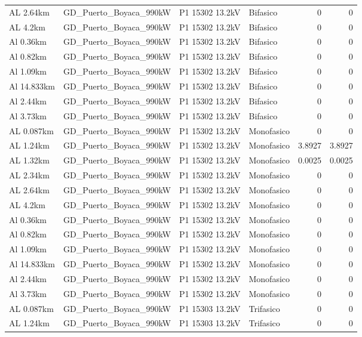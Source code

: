 \documentclass[11pt,a4paper]{article}
\begin{document}
\begin{longtable}{llllrr}
AL 2.64km & GD\_Puerto\_Boyaca\_990kW & P1 15302 13.2kV & Bifasico & 0 & 0 \\
AL 4.2km & GD\_Puerto\_Boyaca\_990kW & P1 15302 13.2kV & Bifasico & 0 & 0 \\
Al 0.36km & GD\_Puerto\_Boyaca\_990kW & P1 15302 13.2kV & Bifasico & 0 & 0 \\
Al 0.82km & GD\_Puerto\_Boyaca\_990kW & P1 15302 13.2kV & Bifasico & 0 & 0 \\
Al 1.09km & GD\_Puerto\_Boyaca\_990kW & P1 15302 13.2kV & Bifasico & 0 & 0 \\
Al 14.833km & GD\_Puerto\_Boyaca\_990kW & P1 15302 13.2kV & Bifasico & 0 & 0 \\
Al 2.44km & GD\_Puerto\_Boyaca\_990kW & P1 15302 13.2kV & Bifasico & 0 & 0 \\
Al 3.73km & GD\_Puerto\_Boyaca\_990kW & P1 15302 13.2kV & Bifasico & 0 & 0 \\
AL 0.087km & GD\_Puerto\_Boyaca\_990kW & P1 15302 13.2kV & Monofasico & 0 & 0 \\
AL 1.24km & GD\_Puerto\_Boyaca\_990kW & P1 15302 13.2kV & Monofasico & 3.8927 & 3.8927 \\
AL 1.32km & GD\_Puerto\_Boyaca\_990kW & P1 15302 13.2kV & Monofasico & 0.0025 & 0.0025 \\
AL 2.34km & GD\_Puerto\_Boyaca\_990kW & P1 15302 13.2kV & Monofasico & 0 & 0 \\
AL 2.64km & GD\_Puerto\_Boyaca\_990kW & P1 15302 13.2kV & Monofasico & 0 & 0 \\
AL 4.2km & GD\_Puerto\_Boyaca\_990kW & P1 15302 13.2kV & Monofasico & 0 & 0 \\
Al 0.36km & GD\_Puerto\_Boyaca\_990kW & P1 15302 13.2kV & Monofasico & 0 & 0 \\
Al 0.82km & GD\_Puerto\_Boyaca\_990kW & P1 15302 13.2kV & Monofasico & 0 & 0 \\
Al 1.09km & GD\_Puerto\_Boyaca\_990kW & P1 15302 13.2kV & Monofasico & 0 & 0 \\
Al 14.833km & GD\_Puerto\_Boyaca\_990kW & P1 15302 13.2kV & Monofasico & 0 & 0 \\
Al 2.44km & GD\_Puerto\_Boyaca\_990kW & P1 15302 13.2kV & Monofasico & 0 & 0 \\
Al 3.73km & GD\_Puerto\_Boyaca\_990kW & P1 15302 13.2kV & Monofasico & 0 & 0 \\
AL 0.087km & GD\_Puerto\_Boyaca\_990kW & P1 15303 13.2kV & Trifasico & 0 & 0 \\
AL 1.24km & GD\_Puerto\_Boyaca\_990kW & P1 15303 13.2kV & Trifasico & 0 & 0 \\

\end{longtable}
\end{document}
